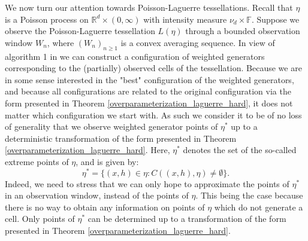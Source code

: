 \documentclass{article}
\newcommand{\RR}{\mathbb{R}}
\theoremstyle{plain}
\theoremstyle{remark}
\theoremstyle{definition}
\begin{document}
We now turn our attention towards Poisson-Laguerre tessellations. Recall that $\eta$ is a Poisson process on $\RR^d \times (0,\infty)$ with intensity measure $\nu_d \times \mathbb{F}$. Suppose we observe the Poisson-Laguerre tessellation $L(\eta)$ through a bounded observation window $W_n$, where $(W_n)_{n \geq 1}$ is a convex averaging sequence. In view of algorithm 1 in \cite{Duan2014} we can construct a configuration of weighted generators corresponding to the (partially) observed cells of the tessellation. Because we are in some sense interested in the "best" configuration of the weighted generators, and because all configurations are related to the original configuration via the form presented in Theorem \ref{overparameterization_laguerre_hard}, it does not matter which configuration we start with. As such we consider it to be of no loss of generality that we observe weighted generator points of $\eta^*$ up to a deterministic transformation of the form presented in Theorem \ref{overparameterization_laguerre_hard}. Here, $\eta^*$ denotes the set of the so-called extreme points of $\eta$, and is given by:
\[\eta^* = \{(x,h) \in \eta: C((x,h),\eta) \neq \emptyset\}.\]
Indeed, we need to stress that we can only hope to approximate the points of $\eta^*$ in an observation window, instead of the points of $\eta$. This being the case because there is no way to obtain any information on points of $\eta$ which do not generate a cell. Only points of $\eta^*$ can be determined up to a transformation of the form presented in Theorem \ref{overparameterization_laguerre_hard}.
\end{document}
